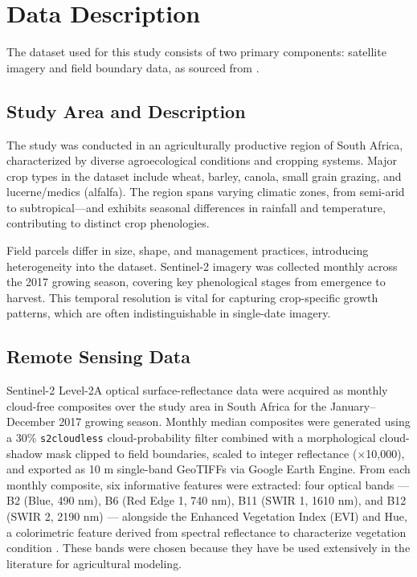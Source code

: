 \documentclass[pdflatex,sn-mathphys]{sn-jnl} %
\begin{document}
\section{Data Description}

The dataset used for this study consists of two primary components: satellite imagery and field boundary data, as sourced from \cite{sa_comp}.

\subsection{Study Area and Description}

The study was conducted in an agriculturally productive region of South Africa, characterized by diverse agroecological conditions and cropping systems. Major crop types in the dataset include wheat, barley, canola, small grain grazing, and lucerne/medics (alfalfa). The region spans varying climatic zones, from semi-arid to subtropical—and exhibits seasonal differences in rainfall and temperature, contributing to distinct crop phenologies.

Field parcels differ in size, shape, and management practices, introducing heterogeneity into the dataset. Sentinel-2 imagery was collected monthly across the 2017 growing season, covering key phenological stages from emergence to harvest. This temporal resolution is vital for capturing crop-specific growth patterns, which are often indistinguishable in single-date imagery.


\subsection{Remote Sensing Data}

Sentinel-2 Level-2A optical surface-reflectance data were acquired as monthly cloud-free composites over the study area in South Africa for the January–December 2017 growing season. Monthly median composites were generated using a 30\% \texttt{s2cloudless} cloud-probability filter combined with a morphological cloud-shadow mask clipped to field boundaries, scaled to integer reflectance ($\times$10,000), and exported as 10 m single-band GeoTIFFs via Google Earth Engine. From each monthly composite, six informative features were extracted: four optical bands — B2 (Blue, 490 nm), B6 (Red Edge 1, 740 nm), B11 (SWIR 1, 1610 nm), and B12 (SWIR 2, 2190 nm) — alongside the Enhanced Vegetation Index (EVI) and Hue, a colorimetric feature derived from spectral reflectance to characterize vegetation condition \cite{mann2023}. These bands were chosen because they have be used extensively in the literature for agricultural modeling. 
\end{document}
